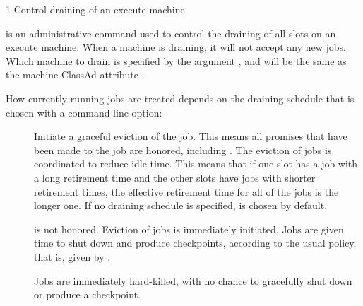 \begin{ManPage}
{\label{man-condor-drain}}{1}
{Control draining of an execute machine}
\Synopsis {}

\ToolDebugOption
{}

\ToolDebugOption
{}


\Description

 is an administrative command used to control the draining
of all slots on an execute machine.  
When a machine is draining, 
it will not accept any new jobs.  
Which machine to drain is specified by the argument ,
and will be the same as the machine ClassAd attribute . 

How currently running jobs are treated 
depends on the draining schedule that is chosen with a command-line option:

\begin{description}

\item[] Initiate a graceful eviction of the job.  
This means all promises that have been made to the job are honored, 
including .  
The eviction of jobs is coordinated to reduce idle time.  
This means that if one slot has a job with a long
retirement time and the other slots have jobs with shorter retirement times, 
the effective retirement time for all of the jobs is the longer one.
If no draining schedule is specified, 
 is chosen by default.

\item[]  is not honored.  
Eviction of jobs is immediately initiated.  
Jobs are given time to shut down and produce checkpoints,
 according to the usual policy, that is, 
given by .

\item[] Jobs are immediately hard-killed,
with no chance to gracefully shut down or produce a checkpoint.

\end{description}


\end{ManPage}
